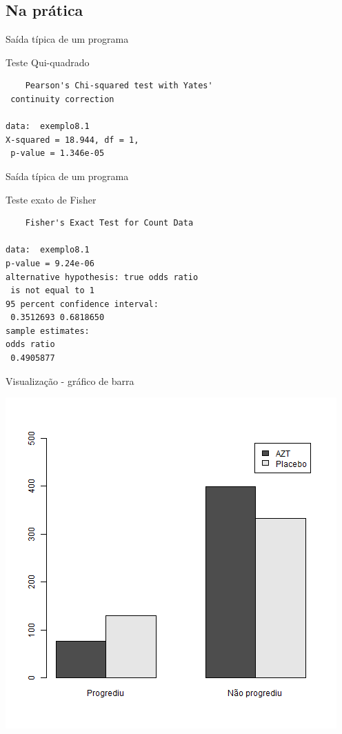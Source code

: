 \documentclass{beamer}
\begin{document}
\subsection{Na prática}


\begin{frame}[fragile]{\scriptsize Saída típica de um programa}
  \begin{exampleblock}{Teste Qui-quadrado}
    \scriptsize
\begin{verbatim}
	Pearson's Chi-squared test with Yates'
 continuity correction

data:  exemplo8.1
X-squared = 18.944, df = 1,
 p-value = 1.346e-05
\end{verbatim}
  \end{exampleblock}
\end{frame}

\begin{frame}[fragile]{\scriptsize Saída típica de um programa}
  \begin{exampleblock}{Teste exato de Fisher}
    \scriptsize
\begin{verbatim}
	Fisher's Exact Test for Count Data

data:  exemplo8.1
p-value = 9.24e-06
alternative hypothesis: true odds ratio
 is not equal to 1
95 percent confidence interval:
 0.3512693 0.6818650
sample estimates:
odds ratio
 0.4905877
\end{verbatim}
  \end{exampleblock}
\end{frame}

\begin{frame}{\scriptsize Visualização - gráfico de barra}
  \begin{center}
    \includegraphics[height=\textheight]{Cap26-27/barplot}
  \end{center}
\end{frame}
\end{document}
